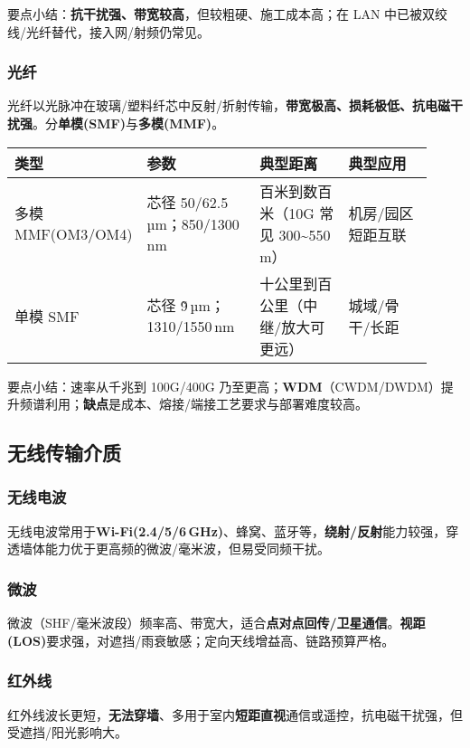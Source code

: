\documentclass[lang=cn,newtx,10pt,scheme=chinese]{../../elegantbook}
\begin{document}
要点小结：\textbf{抗干扰强、带宽较高}，但较粗硬、施工成本高；在 LAN 中已被双绞线/光纤替代，接入网/射频仍常见。
\subsubsection{光纤}
光纤以光脉冲在玻璃/塑料纤芯中反射/折射传输，\textbf{带宽极高、损耗极低、抗电磁干扰强}。分\textbf{单模(SMF)}与\textbf{多模(MMF)}。
\\
{\small\begin{longtable}{|p{0.20\linewidth}|p{0.28\linewidth}|p{0.22\linewidth}|p{0.22\linewidth}|}
\hline
    \textbf{类型} & \textbf{参数} & \textbf{典型距离} & \textbf{典型应用} \\
\hline
多模 MMF(OM3/OM4) & 芯径 50/62.5\,µm；850/1300\,nm & 百米到数百米（10G 常见 300\textasciitilde 550 m） & 机房/园区短距互联 \\
\hline
单模 SMF & 芯径 \~9\,µm；1310/1550\,nm & 十公里到百公里（中继/放大可更远） & 城域/骨干/长距 \\
\hline
\end{longtable}}

要点小结：速率从千兆到 100G/400G 乃至更高；\textbf{WDM}（CWDM/DWDM）提升频谱利用；\textbf{缺点}是成本、熔接/端接工艺要求与部署难度较高。
\subsection{无线传输介质}
\subsubsection{无线电波}
无线电波常用于\textbf{Wi-Fi(2.4/5/6\,GHz)}、蜂窝、蓝牙等，\textbf{绕射/反射}能力较强，穿透墙体能力优于更高频的微波/毫米波，但易受同频干扰。
\subsubsection{微波}
微波（SHF/毫米波段）频率高、带宽大，适合\textbf{点对点回传/卫星通信}。\textbf{视距(LOS)}要求强，对遮挡/雨衰敏感；定向天线增益高、链路预算严格。
\subsubsection{红外线}
红外线波长更短，\textbf{无法穿墙}、多用于室内\textbf{短距直视}通信或遥控，抗电磁干扰强，但受遮挡/阳光影响大。
\end{document}
